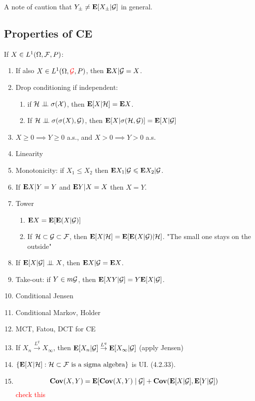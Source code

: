 \documentclass{article}
\newcommand\myworries[1]{\textcolor{red}{#1}}
\begin{document}
A note of caution that $Y_\pm \neq \mathbf{E}[X_\pm |\mathcal G]$ in general. 
\subsection{Properties of CE}
If $X\in L^1(\Omega,\mathcal F,P)$:
\begin{enumerate}
	\item If also $X\in L^1(\Omega,\myworries{\calG},P)$, then $\mathbf{E} X|\mathcal G =X$.
	\item Drop conditioning if independent: 
	\begin{enumerate}
	\item if $\cal H \perp \! \! \! \perp \sigma(X)$, then $\mathbf{E}[X|\mathcal H] = \mathbf{E} X$.
	\item If $\mathcal H \perp \! \! \! \perp \sigma(\sigma(X), \mathcal G)$, then $\mathbf{E}[X|\sigma(\mathcal H,\mathcal G)] = \mathbf{E}[X|\mathcal G]$
	\end{enumerate}
	\item $X\geq 0 \implies Y\geq 0$ a.s., and $X>0 \implies Y>0$ a.s.
	\item Linearity
	\item Monotonicity: if $X_1\leq X_2$ then $\mathbf{E} X_1 |\mathcal G \leqslant \mathbf{E} X_2 |\mathcal G$.
	\item If $\mathbf{E} X|Y = Y$ and $\mathbf{E} Y|X = X$ then $X=Y$. 
	\item Tower
	\begin{enumerate}
	\item $\mathbf{E} X = \mathbf{E} [ \mathbf{E}(X|\mathcal G )]$
	\item If $\mathcal H\subset \mathcal G\subset\mathcal F$, then $\mathbf{E}[X|\mathcal H] = \mathbf{E}[\mathbf{E}(X|\mathcal G)|\mathcal H]$. "The small one stays on the outside" 
	\end{enumerate}

	\item If $\mathbf{E}[X|\mathcal G] \perp \! \! \! \perp X$, then $\mathbf{E} X|\mathcal G = \mathbf{E} X$.
	\item Take-out: if $Y\in m\mathcal G$, then $\mathbf{E}[XY|\mathcal G] = Y \mathbf{E}[X|\mathcal G]$.
	\item Conditional Jensen
	\item Conditional Markov, Holder
	\item MCT, Fatou, DCT for CE
	\item If $X_n \overset{L^q}{\to}X_\infty$, then $\mathbf{E}[X_n|\mathcal G] \overset{L^q}{\to}\mathbf{E}[X_\infty|\mathcal G]$ (apply Jensen)
	\item $\{\mathbf{E}[X|\mathcal H]: \mathcal H\subset \mathcal F \text{ is a sigma algebra}\}$ is UI. (4.2.33).
	\item $$\mathbf{Cov}(X,Y) = \mathbf{E}[\mathbf{Cov}(X,Y) \mid \mathcal G] + \mathbf{Cov}(\mathbf{E}[X|\mathcal G] , \mathbf{E}[Y|\mathcal G])$$ \myworries{check this}

\end{enumerate}
\end{document}
